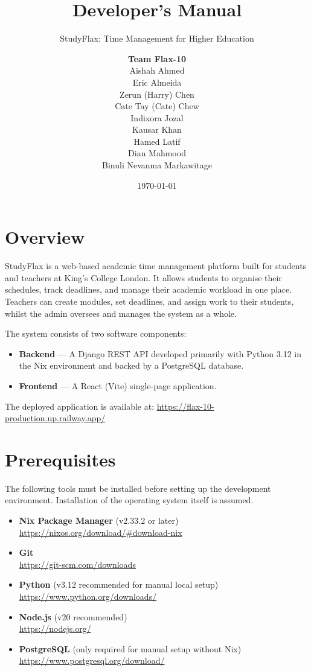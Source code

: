 \documentclass[a4paper, 12pt]{report}
\title{Developer's Manual}
\subtitle{StudyFlax: Time Management for Higher Education}
\author{\textbf{Team Flax-10}\\
Aishah Ahmed\\
Eric Almeida\\
Zerun (Harry) Chen\\
Cate Tay (Cate) Chew\\
Indixora Jozal\\
Kausar Khan\\
Hamed Latif\\
Dian Mahmood\\
Binuli Nevanma Markawitage
}
\date{\today}
\begin{document}
\maketitle
\romantableofcontents

\chapter{Overview}

StudyFlax is a web-based academic time management platform built for
students and teachers at King's College London. It allows students to
organise their schedules, track deadlines, and manage their academic
workload in one place. Teachers can create modules, set deadlines, and
assign work to their students, whilst the admin oversees and manages
the system as a whole.

The system consists of two software components:

\begin{itemize}
    \item \textbf{Backend} --- A Django REST API developed primarily
          with Python 3.12 in the Nix environment and backed
          by a PostgreSQL database.
    \item \textbf{Frontend} --- A React (Vite) single-page application.
\end{itemize}

The deployed application is available at:
\url{https://flax-10-production.up.railway.app/}

\chapter{Prerequisites}

The following tools must be installed before setting up the development
environment. Installation of the operating system itself is assumed.

\begin{itemize}
    \item \textbf{Nix Package Manager} (v2.33.2 or later)\\
          \url{https://nixos.org/download/\#download-nix}

    \item \textbf{Git}\\
          \url{https://git-scm.com/downloads}

    \item \textbf{Python} (v3.12 recommended for manual local setup)\\
          \url{https://www.python.org/downloads/}

    \item \textbf{Node.js} (v20 recommended)\\
          \url{https://nodejs.org/}

    \item \textbf{PostgreSQL} (only required for manual setup without Nix)\\
          \url{https://www.postgresql.org/download/}
\end{itemize}
\end{document}
